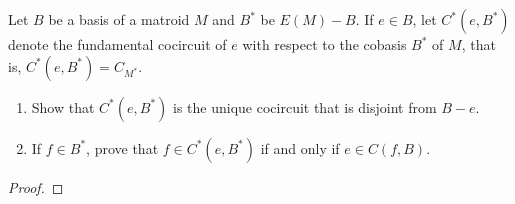 \prob
{
    Let $B$ be a basis of a matroid $M$ and $B^*$ be $E(M) - B$. If $e\in B$, let $C^*(e, B^*)$ denote the fundamental cocircuit
    of $e$ with respect to the cobasis $B^*$ of $M$, that is, $C^*(e, B^*) = C_{M^*}$.
    \begin{enumerate}[label=(\roman*)]
        \item Show that $C^*(e,B^*)$ is the unique cocircuit that is disjoint from $B - e$.
        \item If $f \in B^*$, prove that $f \in C^*(e,B^*)$ if and only if $e \in C(f,B)$.
    \end{enumerate}
}
\begin{proof}
\end{proof}